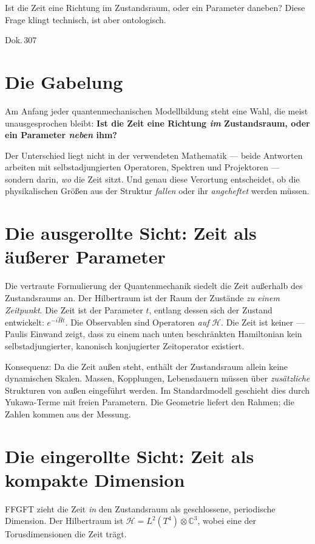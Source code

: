 \label{ch:zeit_zustandsraum}

\epigraph{Ist die Zeit eine Richtung im Zustandsraum,
oder ein Parameter daneben?
Diese Frage klingt technisch, ist aber ontologisch.}{Dok.\,307}

\section{Die Gabelung}

Am Anfang jeder quantenmechanischen Modellbildung steht eine Wahl, die meist
unausgesprochen bleibt: \textbf{Ist die Zeit eine Richtung \emph{im}
Zustandsraum, oder ein Parameter \emph{neben} ihm?}

Der Unterschied liegt nicht in der verwendeten Mathematik --- beide Antworten
arbeiten mit selbstadjungierten Operatoren, Spektren und Projektoren ---
sondern darin, \emph{wo} die Zeit sitzt. Und genau diese Verortung entscheidet,
ob die physikalischen Größen aus der Struktur \emph{fallen} oder ihr
\emph{angeheftet} werden müssen.

\section{Die ausgerollte Sicht: Zeit als äußerer Parameter}

Die vertraute Formulierung der Quantenmechanik siedelt die Zeit außerhalb des
Zustandsraums an. Der Hilbertraum ist der Raum der Zustände \emph{zu einem
Zeitpunkt}. Die Zeit ist der Parameter $t$, entlang dessen sich der Zustand
entwickelt: $e^{-i\hat{H}t}$. Die Observablen sind Operatoren \emph{auf}
$\mathcal{H}$. Die Zeit ist keiner --- Paulis Einwand zeigt, dass zu einem nach
unten beschränkten Hamiltonian kein selbstadjungierter, kanonisch konjugierter
Zeitoperator existiert.

Konsequenz: Da die Zeit außen steht, enthält der Zustandsraum allein
keine dynamischen Skalen. Massen, Kopplungen, Lebensdauern müssen über
\emph{zusätzliche} Strukturen von außen eingeführt werden. Im Standardmodell
geschieht dies durch Yukawa-Terme mit freien Parametern. Die Geometrie liefert
den Rahmen; die Zahlen kommen aus der Messung.

\section{Die eingerollte Sicht: Zeit als kompakte Dimension}

FFGFT zieht die Zeit \emph{in} den Zustandsraum als geschlossene,
periodische Dimension. Der Hilbertraum ist $\mathcal{H} = L^2(T^4) \otimes
\mathbb{C}^3$, wobei eine der Torusdimensionen die Zeit trägt.

